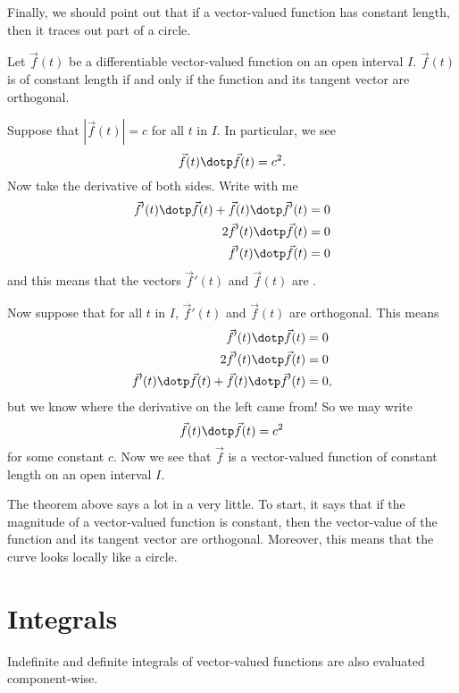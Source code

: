 \documentclass{ximera}
\begin{document}
Finally, we should point out that if a vector-valued function has
constant length, then it traces out part of a circle.
\begin{theorem}
  Let $\vec f(t)$ be a differentiable vector-valued function on an
  open interval $I$. $\vec{f}(t)$ is of constant length if and only if
  the function and its tangent vector are orthogonal.
  \begin{explanation}
    Suppose that $|\vec f(t)| = c$ for all $t$ in $I$. In particular,
    we see
    \[
    \vec{f}(t) \dotp \vec{f}(t) = c^2.
    \]
    Now take the derivative of both sides. Write with me
    \begin{align*}
      \vec{f}'(t) \dotp \vec{f}(t) + \vec{f}(t)\dotp \vec{f}'(t) &= 0\\
      2\vec{f}'(t) \dotp \vec{f}(t) &= 0\\
      \vec{f}'(t) \dotp \vec{f}(t) &= 0
    \end{align*}
    and this means that the vectors $\vec{f}'(t)$ and $\vec{f}(t)$ are
    .

    Now suppose that for all $t$ in $I$, $\vec{f}'(t)$ and
    $\vec{f}(t)$ are orthogonal. This means
    \begin{align*}
      \vec{f}'(t) \dotp \vec{f}(t) &= 0\\
      2\vec{f}'(t) \dotp \vec{f}(t) &= 0\\
      \vec{f}'(t) \dotp \vec{f}(t) + \vec{f}(t)\dotp \vec{f}'(t) &= 0,
    \end{align*}
    but we know where the derivative on the left came from! So we may
    write
    \[
    \vec{f}(t) \dotp \vec{f}(t) = c^2
    \]
    for some constant $c$. Now we see that $\vec{f}$ is a
    vector-valued function of constant length on an open interval
    $I$.
  \end{explanation}
\end{theorem}
The theorem above says a lot in a very little. To start, it says that
if the magnitude of a vector-valued function is constant, then the
vector-value of the function and its tangent vector are
orthogonal. Moreover, this means that the curve looks locally like a
circle.



\section{Integrals}

Indefinite and definite integrals of vector-valued functions are also evaluated component-wise.
\end{document}

